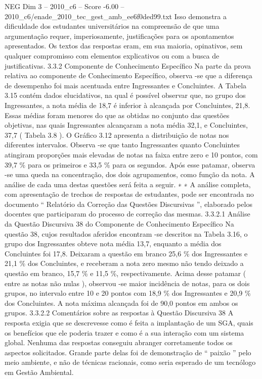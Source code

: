 \begin{textsample}{NEG Dim 3 – 2010\_c6 – Score -6.00 – 2010\_c6/enade\_2010\_tec\_gest\_amb\_ee6f0ded99.txt}
Isso demonstra a dificuldade dos estudantes universitários na compreensão de que uma argumentação requer, imperiosamente, justificações para os apontamentos apresentados.
Os textos das respostas eram, em sua maioria, opinativos, sem qualquer compromisso com elementos explicativos ou com a busca de justificativas. 3.3.2 Componente de Conhecimento Específico Na parte da prova relativa ao componente de Conhecimento Específico, observa -se que a diferença de desempenho foi mais acentuada entre Ingressantes e Concluintes.
A Tabela 3.15 contém dados elucidativos, na qual é possível observar que, no grupo dos Ingressantes, a nota média de 18,7 é inferior à alcançada por Concluintes, 21,8.
Essas médias foram menores do que as obtidas no conjunto das questões objetivas, nas quais Ingressantes alcançaram a nota média 32,1, e Concluintes, 37,7 ( Tabela 3.8 ).
O Gráfico 3.12 apresenta a distribuição de notas nos diferentes intervalos.
Observa -se que tanto Ingressantes quanto Concluintes atingiram proporções mais elevadas de notas na faixa entre zero e 10 pontos, com 39,7 \% para os primeiros e 33,5 \% para os segundos.
Após esse patamar, observa -se uma queda na concentração, dos dois agrupamentos, como função da nota.
A análise de cada uma destas questões será feita a seguir. ∗ ∗ A análise completa, com apresentação de trechos de respostas de estudantes, pode ser encontrada no documento “ Relatório da Correção das Questões Discursivas ”, elaborado pelos docentes que participaram do processo de correção das mesmas. 3.3.2.1 Análise da Questão Discursiva 38 do Componente de Conhecimento Específico Na questão 38, cujos resultados aferidos encontram -se descritos na Tabela 3.16, o grupo dos Ingressantes obteve nota média 13,7, enquanto a média dos Concluintes foi 17,8.
Deixaram a questão em branco 25,6 \% dos Ingressantes e 21,1 \% dos Concluintes, e receberam a nota zero mesmo não tendo deixado a questão em branco, 15,7 \% e 11,5 \%, respectivamente.
Acima desse patamar ( entre as notas não nulas ), observou -se maior incidência de notas, para os dois grupos, no intervalo entre 10 e 20 pontos com 18,9 \% dos Ingressantes e 20,9 \% dos Concluintes.
A nota máxima alcançada foi de 90,0 pontos em ambos os grupos. 3.3.2.2 Comentários sobre as respostas à Questão Discursiva 38 A resposta exigia que se descrevesse como é feita a implantação de um SGA, quais os benefícios que ele poderia trazer e como é a sua interação com um sistema global.
Nenhuma das respostas conseguiu abranger corretamente todos os aspectos solicitados.
Grande parte delas foi de demonstração de “ paixão ” pelo meio ambiente, e não de técnicas racionais, como seria esperado de um tecnólogo em Gestão Ambiental.

\end{textsample}

